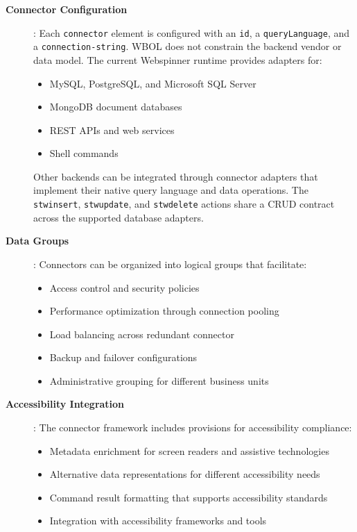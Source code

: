 \begin{description}
\item[\textbf{Connector Configuration}]: Each \texttt{connector} element is configured with an \texttt{id}, a \texttt{queryLanguage}, and a \texttt{connection-string}. WBOL does not constrain the backend vendor or data model. The current Webspinner runtime provides adapters for:
\begin{itemize}
\item MySQL, PostgreSQL, and Microsoft SQL Server
\item MongoDB document databases
\item REST APIs and web services
\item Shell commands
\end{itemize}
Other backends can be integrated through connector adapters that implement their native query language and data operations. The \texttt{stwinsert}, \texttt{stwupdate}, and \texttt{stwdelete} actions share a CRUD contract across the supported database adapters.

\item[\textbf{Data Groups}]: Connectors can be organized into logical groups that facilitate:
\begin{itemize}
\item Access control and security policies
\item Performance optimization through connection pooling
\item Load balancing across redundant connector
\item Backup and failover configurations
\item Administrative grouping for different business units
\end{itemize}

\item[\textbf{Accessibility Integration}]: The connector framework includes provisions for accessibility compliance:
\begin{itemize}
\item Metadata enrichment for screen readers and assistive technologies
\item Alternative data representations for different accessibility needs
\item Command result formatting that supports accessibility standards
\item Integration with accessibility frameworks and tools
\end{itemize}
\end{description}

